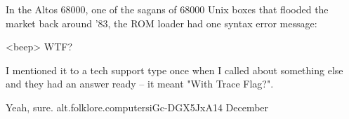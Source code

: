 \begin{new}

	\begin{usenet}
		In the Altos 68000, one of the sagans of 68000 Unix boxes that flooded
		the market back around '83, the ROM loader had one syntax error message:

		\begin{usenet}
			<beep> WTF?
		\end{usenet}

		I mentioned it to a tech support type once when I called about something
		else and they had an answer ready -- it meant "With Trace Flag?".

		Yeah, sure.
			{alt.folklore.computers}{iGc-DGX5JxA}{14 December}
	\end{usenet}
\end{new}

